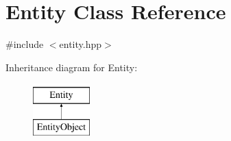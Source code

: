\hypertarget{class_entity}{}\section{Entity Class Reference}
\label{class_entity}


{\ttfamily \#include $<$entity.\+hpp$>$}

Inheritance diagram for Entity\+:\begin{figure}[H]
\begin{center}
\leavevmode
\includegraphics[height=2.000000cm]{class_entity}
\end{center}
\end{figure}
